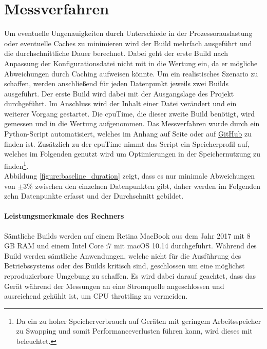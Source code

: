 \documentclass[11pt]{report}
\begin{document}
		\section{Messverfahren}
			Um eventuelle Ungenauigkeiten durch Unterschiede in der Prozessorauslastung oder eventuelle Caches zu minimieren wird der Build mehrfach ausgeführt und die durchschnittliche Dauer berechnet. Dabei geht der erste Build nach Anpassung der Konfigurationsdatei nicht mit in die Wertung ein, da er mögliche Abweichungen durch Caching aufweisen könnte. Um ein realistisches Szenario zu schaffen, werden anschließend für jeden Datenpunkt jeweils zwei Builds ausgeführt. Der erste Build wird dabei mit der Ausgangslage des Projekt durchgeführt. Im Anschluss wird der Inhalt einer Datei verändert und ein weiterer Vorgang gestartet. Die \Gls{cpuTime}, die dieser zweite Build benötigt, wird gemessen und in die Wertung aufgenommen. Das Messverfahren wurde durch ein Python-Script automatisiert, welches im Anhang auf Seite \pageref{pythonScript} oder auf \href{https://github.com/TexNAK/WebBundlerOptimization/blob/40c8c00dee7af6970bc82c29e2fc0f3cfd6c12eb/webpack-project/runBuilds.py}{GitHub} zu finden ist. Zusätzlich zu der \Gls{cpuTime} nimmt das Script ein Speicherprofil auf, welches im Folgenden genutzt wird um Optimierungen in der Speichernutzung zu finden\footnote{Da ein zu hoher Speicherverbrauch auf Geräten mit geringem Arbeitsspeicher zu Swapping und somit Performanceverlusten führen kann, wird dieses mit beleuchtet.}.\\
			Abbildung \ref{figure:baseline_duration} zeigt, dass es nur minimale Abweichungen von $\pm 3 \%$ zwischen den einzelnen Datenpunkten gibt, daher werden im Folgenden zehn Datenpunkte erfasst und der Durchschnitt gebildet.
			
			\paragraph{Leistungsmerkmale des Rechners} Sämtliche Builds werden auf einem Retina MacBook aus dem Jahr 2017 mit 8 GB RAM und einem Intel Core i7 mit macOS 10.14 durchgeführt. Während des Build werden sämtliche Anwendungen, welche nicht für die Ausführung des Betriebssystems oder des Builds kritisch sind, geschlossen um eine möglichst reproduzierbare Umgebung zu schaffen. Es wird dabei darauf geachtet, dass das Gerät während der Messungen an eine Stromquelle angeschlossen und ausreichend gekühlt ist, um CPU throttling zu vermeiden.
\end{document}
